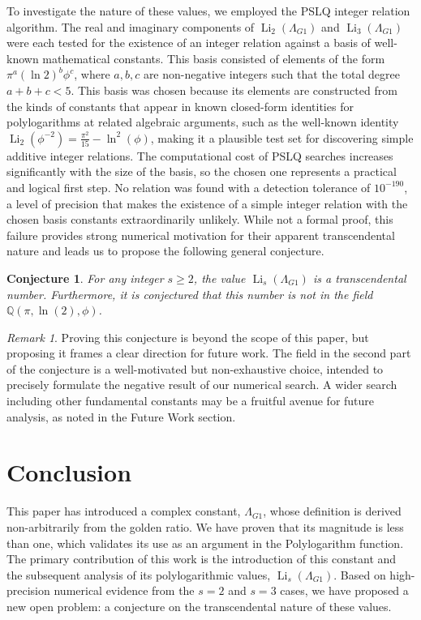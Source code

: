 \documentclass{amsart}
\theoremstyle{plain}
\newtheorem{conjecture}[theorem]{Conjecture}
\theoremstyle{definition}
\theoremstyle{remark}
\newtheorem*{remark}{Remark}
\DeclareMathOperator{\Li}{Li} %
\newcommand{\LambdaG}{\Lambda_{G1}}
\newcommand{\phiG}{\phi}
\begin{document}
To investigate the nature of these values, we employed the PSLQ integer relation algorithm. The real and imaginary components of $\Li_2(\LambdaG)$ and $\Li_3(\LambdaG)$ were each tested for the existence of an integer relation against a basis of well-known mathematical constants. This basis consisted of elements of the form $\pi^a (\ln 2)^b \phiG^c$, where $a,b,c$ are non-negative integers such that the total degree $a+b+c < 5$. This basis was chosen because its elements are constructed from the kinds of constants that appear in known closed-form identities for polylogarithms at related algebraic arguments, such as the well-known identity $\Li_2(\phiG^{-2})=\frac{\pi^{2}}{15}-\ln^{2}(\phiG)$, making it a plausible test set for discovering simple additive integer relations. The computational cost of PSLQ searches increases significantly with the size of the basis, so the chosen one represents a practical and logical first step. No relation was found with a detection tolerance of $10^{-190}$, a level of precision that makes the existence of a simple integer relation with the chosen basis constants extraordinarily unlikely. While not a formal proof, this failure provides strong numerical motivation for their apparent transcendental nature and leads us to propose the following general conjecture.

\begin{conjecture}
For any integer $s \ge 2$, the value $\Li_s(\LambdaG)$ is a transcendental number. Furthermore, it is conjectured that this number is not in the field $\mathbb{Q}(\pi, \ln(2), \phiG)$.
\end{conjecture}
\begin{remark}
Proving this conjecture is beyond the scope of this paper, but proposing it frames a clear direction for future work. The field in the second part of the conjecture is a well-motivated but non-exhaustive choice, intended to precisely formulate the negative result of our numerical search. A wider search including other fundamental constants may be a fruitful avenue for future analysis, as noted in the Future Work section.
\end{remark}

\section{Conclusion}
This paper has introduced a complex constant, $\LambdaG$, whose definition is derived non-arbitrarily from the golden ratio. We have proven that its magnitude is less than one, which validates its use as an argument in the Polylogarithm function. The primary contribution of this work is the introduction of this constant and the subsequent analysis of its polylogarithmic values, $\Li_s(\LambdaG)$. Based on high-precision numerical evidence from the $s=2$ and $s=3$ cases, we have proposed a new open problem: a conjecture on the transcendental nature of these values.
\end{document}
